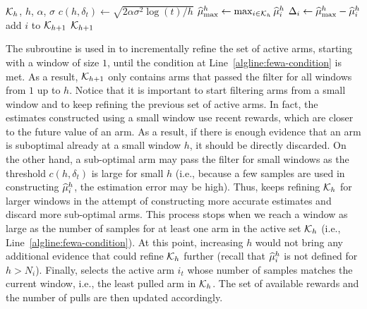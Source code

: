 \begin{algorithm}[!ht]
\caption{{\FILTER}}
\label{alg:filter}
\begin{algorithmic}[1]
\Require $\mathcal{K}_{h}$, $h$, $\alpha$, $\sigma$
\State $c(h, \delta_t) \leftarrow \sqrt{2\alpha\sigma^2\log{(t)}/h }$
\State $\widehat{\mu}^h_{\max}  \leftarrow \max_{i \in \mathcal{K}_{h}}\widehat{\mu}_i^h$\label{algline:filter-max}
	\State $\Delta_i \leftarrow  \widehat{\mu}^h_{\max} - \widehat{\mu}^h_{i} $ \label{algline:filter-delta}
	\State add $i$ to $\mathcal{K}_{h+1}$ \label{algline:filter-add}
	\EndIf
\EndFor
\Ensure $\mathcal{K}_{h+1}$
\end{algorithmic}
\end{algorithm}



The \FILTER subroutine is used in \FEWA to incrementally refine the set of active arms, starting with a window of size $1$, until the condition at Line~\ref{algline:fewa-condition} is met. As a result, $\mathcal{K}_{h+1}$ only contains arms that passed the filter for all windows from $1$ up to $h$. Notice that it is important to start filtering arms from a small window and to keep refining the previous set of active arms. 
In fact, the estimates constructed using a small window use recent rewards, which are closer to the future value of an arm. As a result, if there is enough evidence that an arm is suboptimal already at a small window $h$, it should be directly discarded. On the other hand, a sub-optimal arm may pass the filter for small windows as the threshold $c(h , \delta_t)$ is large for small $h$ (i.e., because a few samples are used in constructing $\widehat{\mu}_i^h$, the estimation error may be high). Thus, \FEWA keeps refining $\mathcal{K}_{h}$ for larger windows in the attempt of constructing more accurate estimates and discard more sub-optimal arms. This process stops when we reach a window as large as the number of samples for at least one arm in the active set $\mathcal{K}_{h}$ (i.e., Line~\ref{algline:fewa-condition}). At this point, increasing $h$ would not bring any additional evidence that could refine $\mathcal{K}_{h}$ further (recall that $\widehat{\mu}^h_i$ is not defined for $h > N_i$). Finally,  \FEWA selects the active arm $i_t$ whose number of samples matches the current window, i.e., the least pulled arm in $\mathcal{K}_{h}$. The set of available rewards and the number of pulls are then updated accordingly. 

